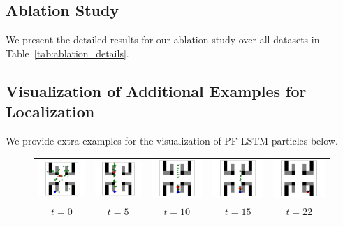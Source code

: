 \documentclass[letterpaper]{article} %
\begin{document}
\subsection{Ablation Study}
We present the detailed results for our ablation study over all datasets in Table~\ref{tab:ablation_details}.

\subsection{Visualization of Additional Examples for Localization}
We provide extra examples for the visualization of PF-LSTM particles below.
\label{sec:additional_localization}
\begin{figure}[!htb]
	\centering
	\begin{tabular}{ccccc}
		\includegraphics[width=0.18\linewidth]{figs/123/0.pdf} &
		\includegraphics[width=0.18\linewidth]{figs/123/5.pdf} &
		\includegraphics[width=0.18\linewidth]{figs/123/12.pdf} &
		\includegraphics[width=0.18\linewidth]{figs/123/14.pdf} &
		\includegraphics[width=0.18\linewidth]{figs/123/23.pdf} \\
		$t=0$ & $t=5$ & $t=10$ & $t=15$ & $t=22$
	\end{tabular}
\end{figure}
\end{document}
